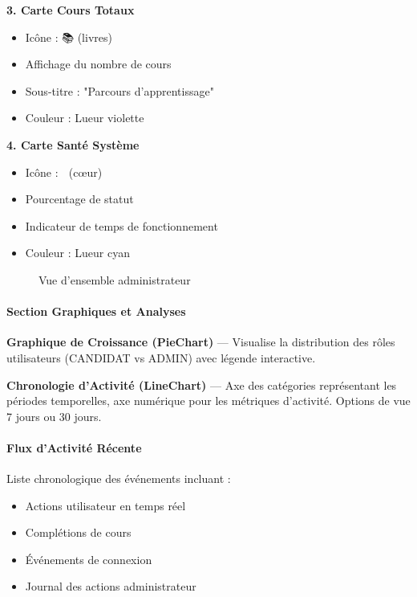 \documentclass[12pt, a4paper]{report}
\begin{document}
\textbf{3. Carte Cours Totaux}
\begin{itemize}
    \item Icône : 📚 (livres)
    \item Affichage du nombre de cours
    \item Sous-titre : "Parcours d'apprentissage"
    \item Couleur : Lueur violette
\end{itemize}

\textbf{4. Carte Santé Système}
\begin{itemize}
    \item Icône : 💚 (cœur)
    \item Pourcentage de statut
    \item Indicateur de temps de fonctionnement
    \item Couleur : Lueur cyan
\end{itemize}

\begin{figure}[H]
    \centering
    \caption{Vue d'ensemble administrateur}
    \label{fig:admin-dashboard}
\end{figure}

\paragraph{Section Graphiques et Analyses}

\textbf{Graphique de Croissance (PieChart)} --- Visualise la distribution des rôles utilisateurs (CANDIDAT vs ADMIN) avec légende interactive.

\textbf{Chronologie d'Activité (LineChart)} --- Axe des catégories représentant les périodes temporelles, axe numérique pour les métriques d'activité. Options de vue 7 jours ou 30 jours.

\paragraph{Flux d'Activité Récente}
Liste chronologique des événements incluant :
\begin{itemize}
    \item Actions utilisateur en temps réel
    \item Complétions de cours
    \item Événements de connexion
    \item Journal des actions administrateur
\end{itemize}
\end{document}
